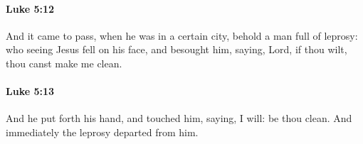 		\paragraph{Luke 5:12} %
			\label{LUKE-5-12}

			And it came to pass, when he was in a certain city, behold a man full of leprosy: who seeing Jesus fell on his face, and besought him, saying, Lord, if thou wilt, thou canst make me clean.

			\begin{framed}
			\scriptsize
				\begin{compactdesc}
					\item[SBLG] 
				\end{compactdesc}
			\end{framed}

		\paragraph{Luke 5:13} %
			\label{LUKE-5-13}

			And he put forth his hand, and touched him, saying, I will: be thou clean. And immediately the leprosy departed from him.

